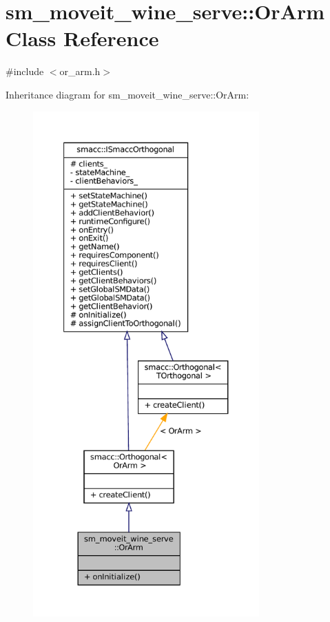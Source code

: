 \hypertarget{classsm__moveit__wine__serve_1_1OrArm}{}\section{sm\+\_\+moveit\+\_\+wine\+\_\+serve\+:\+:Or\+Arm Class Reference}
\label{classsm__moveit__wine__serve_1_1OrArm}


{\ttfamily \#include $<$or\+\_\+arm.\+h$>$}



Inheritance diagram for sm\+\_\+moveit\+\_\+wine\+\_\+serve\+:\+:Or\+Arm\+:
\nopagebreak
\begin{figure}[H]
\begin{center}
\leavevmode
\includegraphics[height=550pt]{classsm__moveit__wine__serve_1_1OrArm__inherit__graph}
\end{center}
\end{figure}


